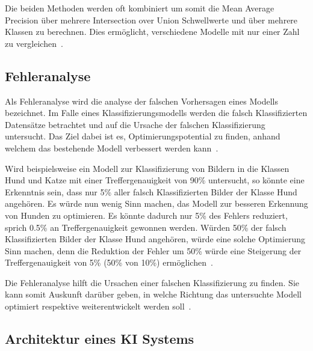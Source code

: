 Die beiden Methoden werden oft kombiniert um somit die Mean Average Precision über mehrere Intersection over Union Schwellwerte und über mehrere Klassen zu berechnen. Dies ermöglicht, verschiedene Modelle mit nur einer Zahl zu vergleichen~\autocite{AP}.

\subsection{Fehleranalyse}
\label{chap:error-analysis}

Als Fehleranalyse wird die analyse der falschen Vorhersagen eines Modells bezeichnet. Im Falle eines Klassifizierungsmodells werden die falsch Klassifizierten Datensätze betrachtet und auf die Ursache der falschen Klassifizierung untersucht. Das Ziel dabei ist es, Optimierungspotential zu finden, anhand welchem das bestehende Modell verbessert werden kann~\autocite{MLYearning}.

Wird beispielsweise ein Modell zur Klassifizierung von Bildern in die Klassen Hund und Katze mit einer Treffergenauigkeit von 90\% untersucht, so könnte eine Erkenntnis sein, dass nur 5\% aller falsch Klassifizierten Bilder der Klasse Hund angehören. Es würde nun wenig Sinn machen, das Modell zur besseren Erkennung von Hunden zu optimieren. Es könnte dadurch nur 5\% des Fehlers reduziert, sprich 0.5\% an Treffergenauigkeit gewonnen werden. Würden 50\% der falsch Klassifizierten Bilder der Klasse Hund angehören, würde eine solche Optimierung Sinn machen, denn die Reduktion der Fehler um 50\% würde eine Steigerung der Treffergenauigkeit von 5\% (50\% von 10\%) ermöglichen~\autocite{MLYearning}.

Die Fehleranalyse hilft die Ursachen einer falschen Klassifizierung zu finden. Sie kann somit Auskunft darüber geben, in welche Richtung das untersuchte Modell optimiert respektive weiterentwickelt werden soll~\autocite{MLYearning}.


\subsection{Architektur eines KI Systems}

